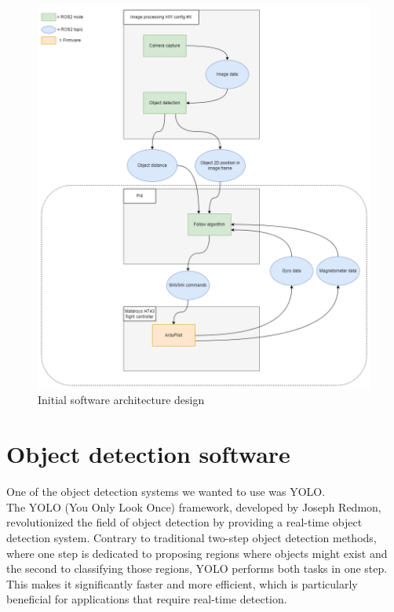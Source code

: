 \begin{figure}[H]
    \centering
    \includegraphics[scale=0.5]{a_martinbilder/initial_software_arch.drawio.png}
    \caption{Initial software architecture design}
    \label{fig:initial_software_architecture}
\end{figure}



\section{Object detection software}

One of the object detection systems we wanted to use was YOLO.\\

The YOLO (You Only Look Once) framework, developed by Joseph Redmon, revolutionized the field of object detection by providing a real-time object detection system. Contrary to traditional two-step object detection methods, where one step is dedicated to proposing regions where objects might exist and the second to classifying those regions, YOLO performs both tasks in one step. This makes it significantly faster and more efficient, which is particularly beneficial for applications that require real-time detection.\cite{YOLO}

